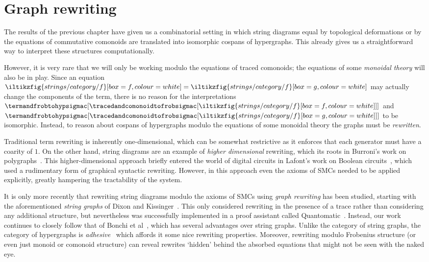 \chapter{Graph rewriting}

The results of the previous chapter have given us a combinatorial setting in
which string diagrams equal by topological deformations or by the equations of
commutative comonoids are translated into isomorphic cospans of hypergraphs.
This already gives us a straightforward way to interpret these structures
computationally.

However, it is very rare that we will only be working modulo the equations of
traced comonoids; the equations of some \emph{monoidal theory} will also be in
play.
Since an equation \(
\iltikzfig{strings/category/f}[box=f,colour=white]
=
\iltikzfig{strings/category/f}[box=g,colour=white]
\) may actually change the components of the term, there is no reason for the
interpretations \(
\termandfrobtohypsigmac[
    \tracedandcomonoidtofrobsigmac[
        \iltikzfig{strings/category/f}[box=f,colour=white]
    ]
]
\) and \(
\termandfrobtohypsigmac[
    \tracedandcomonoidtofrobsigmac[
        \iltikzfig{strings/category/f}[box=g,colour=white]
    ]
]
\) to be isomorphic.
Instead, to reason about cospans of hypergraphs modulo the equations of some
monoidal theory the graphs must be \emph{rewritten}.

Traditional term rewriting is inherently one-dimensional, which can be somewhat
restrictive as it enforces that each generator must have a coarity of \(1\).
On the other hand, string diagrams are an example of \emph{higher dimensional}
rewriting, which its roots in Burroni's work on
polygraphs~\cite{burroni1993higherdimensional}.
This higher-dimensional approach briefly entered the world of digital
circuits in Lafont's work on Boolean circuits~\cite{lafont2003algebraic}, which
used a rudimentary form of graphical syntactic rewriting.
However, in this approach even the axioms of SMCs needed to be applied
explicitly, greatly hampering the tractability of the system.

It is only more recently that rewriting string diagrams modulo the axioms of
SMCs using \emph{graph rewriting} has been studied, starting with the
aforementioned \emph{string graphs} of Dixon and
Kissinger~\cite{dixon2010open,kissinger2012pictures,dixon2013opengraphs}.
This only considered rewriting in the presence of a trace rather than
considering any additional structure, but nevertheless was successfully
implemented in a proof assistant called
Quantomatic~\cite{kissinger2015quantomatic}.
Instead, our work continues to closely follow that of Bonchi et
al~\cite{bonchi2022string,bonchi2022stringa}, which has several advantages
over string graphs.
Unlike the category of string graphs, the category of hypergraphs is
\emph{adhesive}~\cite{lack2004adhesive} which affords it some nice rewriting
properties.
Moreover, rewriting modulo Frobenius structure (or even just monoid or comonoid
structure) can reveal rewrites `hidden' behind the absorbed equations that might
not be seen with the naked eye.

